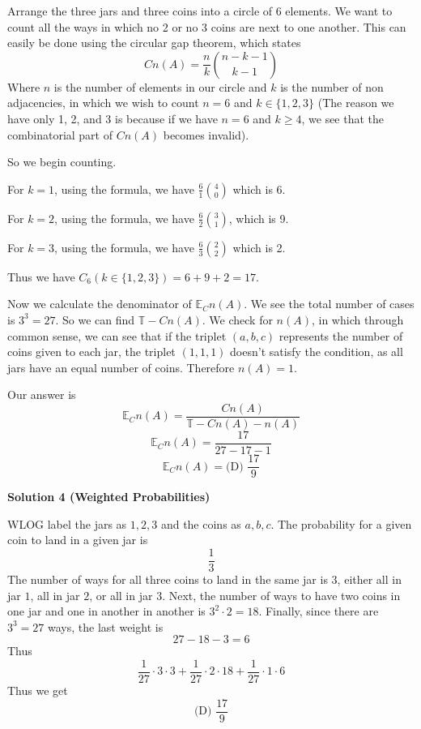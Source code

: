 \begin{enumerate}
 Arrange the three jars and three coins into a circle of 6 elements. We want to count all the ways in which no 2 or no 3 coins are next to one another. This can easily be done using the circular gap theorem, which states
 \[C n(A) = \frac{n}{k} \binom{n-k-1}{k-1}\]Where \( n \) is the number of elements in our circle and \( k \) is the number of non adjacencies, in which we wish to count \( n = 6 \) and \( k \in \{1,2,3\} \) (The reason we have only 1, 2, and 3 is because if we have \( n=6 \) and \( k \ge 4 \), we see that the combinatorial part of \( C n(A) \) becomes invalid).

 So we begin counting.

 For \( k=1 \), using the formula, we have \( \frac{6}{1} \binom{4}{0} \) which is 6.

 For \( k=2 \), using the formula, we have \( \frac{6}{2} \binom{3}{1} \), which is 9.

 For \( k=3 \), using the formula, we have \( \frac{6}{3} \binom{2}{2} \) which is 2.

 Thus we have \( C_6(k \in \{1,2,3\}) = 6+9+2 = 17 \).

 Now we calculate the denominator of \( \mathbb{E}_C n(A) \). We see the total number of cases is \( 3^3 = 27 \). So we can find \( \mathbb{T} - C n(A) \). We check for \( n(A) \), in which through common sense, we can see that if the triplet $(a,b,c)$ represents the number of coins given to each jar, the triplet $(1,1,1)$ doesn't satisfy the condition, as all jars have an equal number of coins. Therefore \( n(A)=1 \).

 Our answer is
 \[\mathbb{E}_C n(A) = \frac{C n(A)}{\mathbb{T} - C n(A) - n(A)}\]
 \[\mathbb{E}_C n(A) = \frac{17}{27-17-1}\]
 \[\mathbb{E}_C n(A) = \boxed{\text{(D) }\frac{17}{9}}\]




\textbf{Solution 4 (Weighted Probabilities)}

WLOG label the jars as $1,2,3$ and the coins as $a,b,c$. The probability for a given coin to land in a given jar is 
 \[\frac{1}{3}\]The number of ways for all three coins to land in the same jar is $3$, either all in jar $1$, all in jar $2$, or all in jar $3$. Next, the number of ways to have two coins in one jar and one in another in another is $3^2 \cdot 2 = 18$. Finally, since there are $3^3=27$ ways, the last weight is 
 \[27-18-3=6\] Thus 
 \[\frac{1}{27} \cdot 3 \cdot 3 + \frac{1}{27} \cdot 2 \cdot 18 + \frac{1}{27} \cdot 1 \cdot 6\]Thus we get 
 \[\boxed{\text{(D) }\frac{17}{9}}\]





\end{enumerate}
